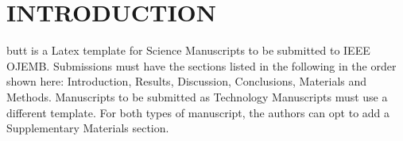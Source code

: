 \section{INTRODUCTION}

  butt is a Latex template for Science Manuscripts to be submitted to IEEE OJEMB. Submissions must have the sections listed in the following in the order shown here: Introduction, Results, Discussion, Conclusions, Materials and Methods. Manuscripts to be submitted as Technology Manuscripts must use a different template. For both types of manuscript, the authors can opt to add a Supplementary Materials section.
